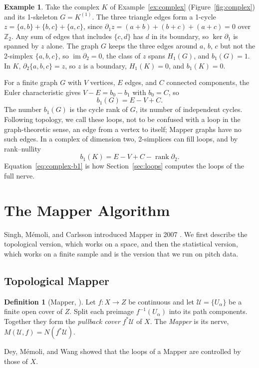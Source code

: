 \documentclass[11pt]{article}
\newcommand{\Z}{\mathbb{Z}}
\DeclareMathOperator{\rank}{rank}
\theoremstyle{definition}
\newtheorem{definition}[theorem]{Definition}
\newtheorem{example}[theorem]{Example}
\theoremstyle{remark}
\begin{document}
\begin{example}\label{ex:homology}
Take the complex $K$ of Example~\ref{ex:complex} (Figure~\ref{fig:complex}) and its 1-skeleton $G = K^{(1)}$.
The three triangle edges form a 1-cycle $z = \{a,b\} + \{b,c\} + \{a,c\}$, since $\partial_1 z = (a+b) + (b+c) + (a+c) = 0$ over $\Z_2$.
Any sum of edges that includes $\{c,d\}$ has $d$ in its boundary, so $\ker \partial_1$ is spanned by $z$ alone.
The graph $G$ keeps the three edges around $a$, $b$, $c$ but not the 2-simplex $\{a,b,c\}$, so $\operatorname{im} \partial_2 = 0$, the class of $z$ spans $H_1(G)$, and $b_1(G) = 1$.
In $K$, $\partial_2 \{a,b,c\} = z$, so $z$ is a boundary, $H_1(K) = 0$, and $b_1(K) = 0$.
\end{example}

For a finite graph $G$ with $V$ vertices, $E$ edges, and $C$ connected components, the Euler characteristic gives $V - E = b_0 - b_1$ with $b_0 = C$, so
\begin{equation}\label{eq:graph-b1}
  b_1(G) = E - V + C.
\end{equation}
The number $b_1(G)$ is the cycle rank of $G$, its number of independent cycles. Following topology, we call these loops, not to be confused with a loop in the graph-theoretic sense, an edge from a vertex to itself; Mapper graphs have no such edges.
In a complex of dimension two, 2-simplices can fill loops, and by rank--nullity
\begin{equation}\label{eq:complex-b1}
  b_1(K) = E - V + C - \rank \partial_2.
\end{equation}
Equation~\eqref{eq:complex-b1} is how Section~\ref{sec:loops} computes the loops of the full nerve.

\section{The Mapper Algorithm}\label{sec:mapper}
Singh, M\'emoli, and Carlsson introduced Mapper in 2007 \parencite{singh2007mapper}.
We first describe the topological version, which works on a space, and then the statistical version, which works on a finite sample and is the version that we run on pitch data.

\subsection{Topological Mapper}
\begin{definition}[Mapper, {\cite{singh2007mapper,deymemoliwang2017}}]
Let $f : X \to Z$ be continuous and let $\mathcal U = \{U_\alpha\}$ be a finite open cover of $Z$.
Split each preimage $f^{-1}(U_\alpha)$ into its path components. Together they form the \emph{pullback cover} $f^*\mathcal U$ of $X$.
The \emph{Mapper} is its nerve, $M(\mathcal U, f) = N(f^*\mathcal U)$.
\end{definition}
Dey, M\'emoli, and Wang showed that the loops of a Mapper are controlled by those of $X$.
\end{document}
